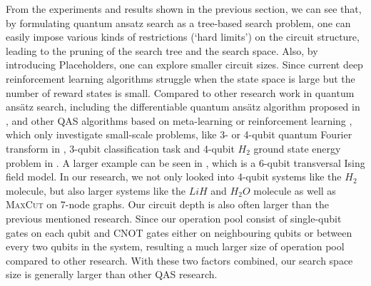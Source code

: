 \documentclass[a4paper,onecolumn,11pt]{quantumarticle}
\begin{document}
From the experiments and results shown in the previous section, we can see that, by formulating quantum ansatz search as a tree-based search problem, one can easily impose various kinds of restrictions (`hard limits') on the circuit structure, leading to the pruning of the search tree and the search space. Also, by introducing Placeholders, one can explore smaller circuit sizes. Since current deep reinforcement learning algorithms struggle when the state space is large but the number of reward states is small. Compared to other research work in quantum ans\"atz search, including the differentiable quantum ans\"atz algorithm proposed in \cite{zhang2021differentiable}, and other QAS algorithms based on meta-learning \cite{chen2021quantum} or reinforcement learning \cite{kuo2021quantum}, which only investigate small-scale problems, like 3- or 4-qubit quantum Fourier transform in \cite{zhang2021differentiable}, 3-qubit classification task and 4-qubit $H_2$ ground state energy problem in \cite{du2020quantum}. A larger example can be seen in \cite{zhang2021neural}, which is a 6-qubit transversal Ising field model. In our research, we not only looked into 4-qubit systems like the $H_2$ molecule, but also larger systems like the $LiH$ and $H_2 O$ molecule as well as \textsc{MaxCut} on 7-node graphs. Our circuit depth is also often larger than the previous mentioned research. Since our operation pool consist of single-qubit gates on each qubit and CNOT gates either on neighbouring qubits or between every two qubits in the system, resulting a much larger size of operation pool compared to other research. With these two factors combined, our search space size is generally larger than other QAS research.

\end{document}

